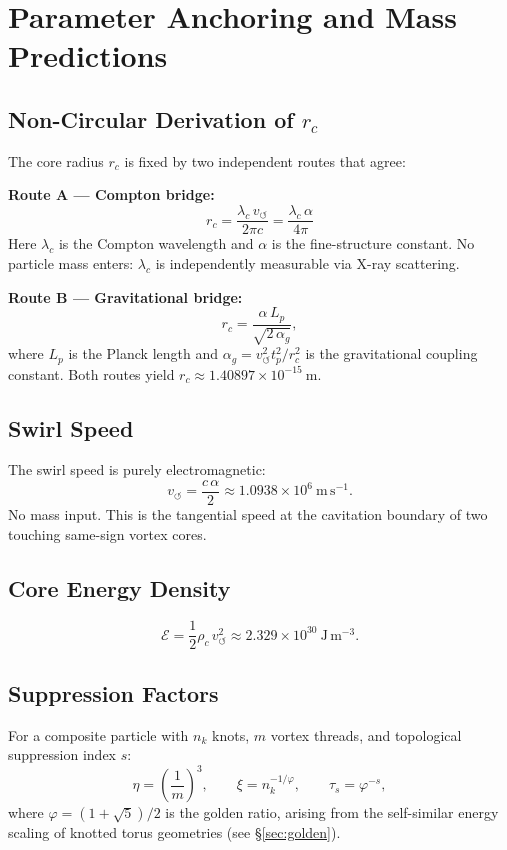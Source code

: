 \documentclass[11pt,a4paper]{article}
\begin{document}
\section{Parameter Anchoring and Mass Predictions}\label{sec:predictions}

\subsection{Non-Circular Derivation of $r_c$}

The core radius $r_c$ is fixed by two independent routes that agree:

\textbf{Route A --- Compton bridge:}
\[
  r_c = \frac{\lambda_c\, v_{\circlearrowleft}}{2\pi c}
      = \frac{\lambda_c\,\alpha}{4\pi}
\]
Here $\lambda_c$ is the Compton wavelength and $\alpha$ is the fine-structure
constant. No particle mass enters: $\lambda_c$ is independently measurable via
X-ray scattering.

\textbf{Route B --- Gravitational bridge:}
\[
  r_c = \frac{\alpha\, L_p}{\sqrt{2\,\alpha_g}},
\]
where $L_p$ is the Planck length and $\alpha_g = v_{\circlearrowleft}^2 t_p^2/r_c^2$
is the gravitational coupling constant. Both routes yield
$r_c \approx 1.40897\times10^{-15}\ \mathrm{m}$.

\subsection{Swirl Speed}

The swirl speed is purely electromagnetic:
\[
  v_{\circlearrowleft} = \frac{c\,\alpha}{2} \approx 1.0938\times10^6\ \mathrm{m\,s^{-1}}.
\]
No mass input. This is the tangential speed at the cavitation boundary of two
touching same-sign vortex cores.

\subsection{Core Energy Density}

\[
  \mathcal{E} = \frac{1}{2}\rho_c\, v_{\circlearrowleft}^2
  \approx 2.329\times10^{30}\ \mathrm{J\,m^{-3}}.
\]

\subsection{Suppression Factors}

For a composite particle with $n_k$ knots, $m$ vortex threads, and topological
suppression index $s$:
\[
  \eta = \left(\frac{1}{m}\right)^3, \qquad
  \xi  = n_k^{-1/\varphi}, \qquad
  \tau_s = \varphi^{-s},
\]
where $\varphi = (1+\sqrt{5})/2$ is the golden ratio, arising from the
self-similar energy scaling of knotted torus geometries (see \S\ref{sec:golden}).
\end{document}
